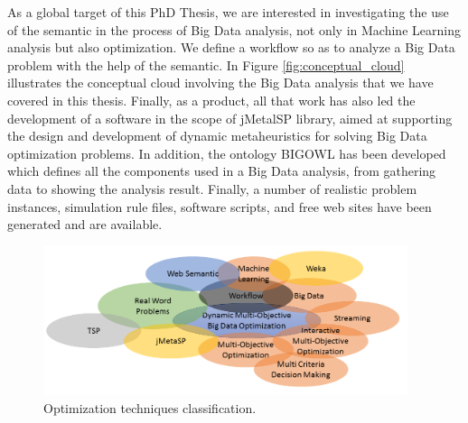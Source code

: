 As a global target of this PhD Thesis, we are interested in investigating the use of the semantic in the process of Big Data analysis, not only in Machine Learning analysis but also optimization. 
We define a workflow so as to analyze a Big Data problem with the help of the semantic. 
In Figure \ref{fig:conceptual_cloud} illustrates the conceptual cloud involving the Big Data analysis that we have covered in this thesis. Finally, as a product, all that work has also led the development of a software in the scope of jMetalSP library, aimed at supporting the design and development of dynamic metaheuristics for solving Big Data optimization problems. In addition, the ontology BIGOWL has been developed which defines all the components used in a Big Data analysis, from gathering data to showing the analysis result.
Finally, a number of realistic problem instances, simulation rule files, software scripts, and free web sites have been generated and are available.


\begin{figure}[H] %
\label{fig:conceptual_cloud}
	\vspace{0.5cm} \centering \includegraphics[width=0.95\textwidth]{figures/introduction/conceptual-model.png}
	\caption{Optimization techniques classification.}\label{fig:OptTechClass} \vspace{0.5cm}
\end{figure}



